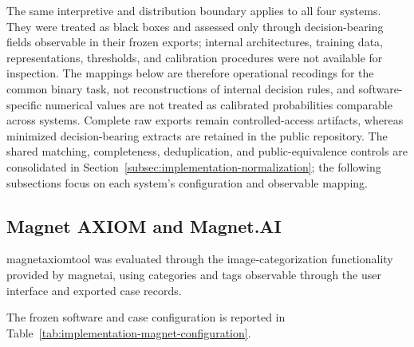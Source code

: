 The same interpretive and distribution boundary applies to all four systems.
They were treated as black boxes and assessed only through decision-bearing
fields observable in their frozen exports; internal architectures, training
data, representations, thresholds, and calibration procedures were not
available for inspection. The mappings below are therefore operational
recodings for the common binary task, not reconstructions of internal decision
rules, and software-specific numerical values are not treated as calibrated
probabilities comparable across systems. Complete raw exports remain
controlled-access artifacts, whereas minimized decision-bearing extracts are
retained in the public repository. The shared matching, completeness,
deduplication, and public-equivalence controls are consolidated in
Section~\ref{subsec:implementation-normalization}; the following subsections
focus on each system's configuration and observable mapping.


\subsection{Magnet AXIOM and Magnet.AI}
\label{subsec:implementation-magnet}

\gls{magnetaxiomtool} was evaluated through the image-categorization
functionality provided by \gls{magnetai}, using categories and tags observable
through the user interface and exported case records.

The frozen software and case configuration is reported in
Table~\ref{tab:implementation-magnet-configuration}.

